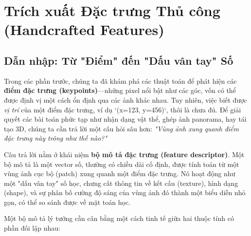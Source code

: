 \section{Trích xuất Đặc trưng Thủ công (Handcrafted Features)}
\label{sec:handcrafted_features}

\subsection{Dẫn nhập: Từ "Điểm" đến "Dấu vân tay" Số}
\label{subsec:handcrafted_intro}

Trong các phần trước, chúng ta đã khám phá các thuật toán để phát hiện các \textbf{điểm đặc trưng (keypoints)}—những pixel nổi bật như các góc, vốn có thể được định vị một cách ổn định qua các ảnh khác nhau. Tuy nhiên, việc biết được \textit{vị trí} của một điểm đặc trưng, ví dụ `(x=123, y=456)`, thôi là chưa đủ. Để giải quyết các bài toán phức tạp như nhận dạng vật thể, ghép ảnh panorama, hay tái tạo 3D, chúng ta cần trả lời một câu hỏi sâu hơn: \textit{"Vùng ảnh xung quanh điểm đặc trưng này trông như thế nào?"}

Câu trả lời nằm ở khái niệm \textbf{bộ mô tả đặc trưng (feature descriptor)}. Một bộ mô tả là một vector số, thường có chiều dài cố định, được tính toán từ một vùng ảnh cục bộ (patch) xung quanh một điểm đặc trưng. Nó hoạt động như một "dấu vân tay" số học, chưng cất thông tin về kết cấu (texture), hình dạng (shape), và sự phân bố cường độ sáng của vùng ảnh đó thành một biểu diễn nhỏ gọn, có thể so sánh được về mặt toán học.

Một bộ mô tả lý tưởng cần cân bằng một cách tinh tế giữa hai thuộc tính có phần đối lập nhau:

